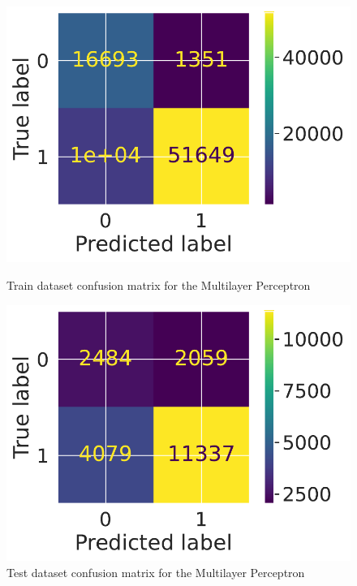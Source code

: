 \documentclass[12pt]{article}
\begin{document}
\begin{figure}
\centering
    \begin{minipage}{0.45\textwidth}
      \centering
      \includegraphics[width=.9\linewidth]{images/mlp_confusion_matrix_train.pdf}
      \caption{Train dataset confusion matrix for the Multilayer Perceptron}
      \label{fig:cm_mlp_train}
    \end{minipage} \hfill
    \begin{minipage}{0.45\textwidth}
      \centering
      \includegraphics[width=.9\linewidth]{images/mlp_confusion_matrix_test.pdf}
      \caption{Test dataset confusion matrix for the Multilayer Perceptron}
      \label{fig:cm_mlp_test}
    \end{minipage}
\end{figure}
\end{document}
